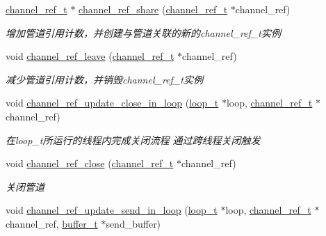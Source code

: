 \begin{DoxyCompactItemize}
\hyperlink{a00050_a151271c9d188ef28d4d24bb81dcc1263_a151271c9d188ef28d4d24bb81dcc1263}{channel\+\_\+ref\+\_\+t} $\ast$ \hyperlink{a00101_ga7b76c4078bbe8272206a5d7467ccd4ed_ga7b76c4078bbe8272206a5d7467ccd4ed}{channel\+\_\+ref\+\_\+share} (\hyperlink{a00050_a151271c9d188ef28d4d24bb81dcc1263_a151271c9d188ef28d4d24bb81dcc1263}{channel\+\_\+ref\+\_\+t} $\ast$channel\+\_\+ref)
\begin{DoxyCompactList}\small\item\em 增加管道引用计数，并创建与管道关联的新的channel\+\_\+ref\+\_\+t实例 \end{DoxyCompactList}\item 
void \hyperlink{a00101_gab4248c6e10ac538b5d37b927bbe39ef1_gab4248c6e10ac538b5d37b927bbe39ef1}{channel\+\_\+ref\+\_\+leave} (\hyperlink{a00050_a151271c9d188ef28d4d24bb81dcc1263_a151271c9d188ef28d4d24bb81dcc1263}{channel\+\_\+ref\+\_\+t} $\ast$channel\+\_\+ref)
\begin{DoxyCompactList}\small\item\em 减少管道引用计数，并销毁channel\+\_\+ref\+\_\+t实例 \end{DoxyCompactList}\item 
void \hyperlink{a00047_acd7537431cf488ed39e782e63f79d997_acd7537431cf488ed39e782e63f79d997}{channel\+\_\+ref\+\_\+update\+\_\+close\+\_\+in\+\_\+loop} (\hyperlink{a00050_a9c3ad1cd2de83e09f3a7b59fa82c94ee_a9c3ad1cd2de83e09f3a7b59fa82c94ee}{loop\+\_\+t} $\ast$loop, \hyperlink{a00050_a151271c9d188ef28d4d24bb81dcc1263_a151271c9d188ef28d4d24bb81dcc1263}{channel\+\_\+ref\+\_\+t} $\ast$channel\+\_\+ref)
\begin{DoxyCompactList}\small\item\em 在loop\+\_\+t所运行的线程内完成关闭流程 通过跨线程关闭触发 \end{DoxyCompactList}\item 
void \hyperlink{a00101_ga49d6ba5f0b9aad95ae5c5710dca392a1_ga49d6ba5f0b9aad95ae5c5710dca392a1}{channel\+\_\+ref\+\_\+close} (\hyperlink{a00050_a151271c9d188ef28d4d24bb81dcc1263_a151271c9d188ef28d4d24bb81dcc1263}{channel\+\_\+ref\+\_\+t} $\ast$channel\+\_\+ref)
\begin{DoxyCompactList}\small\item\em 关闭管道 \end{DoxyCompactList}\item 
void \hyperlink{a00047_ab2afcbb2288d9654f7eb656a8c242167_ab2afcbb2288d9654f7eb656a8c242167}{channel\+\_\+ref\+\_\+update\+\_\+send\+\_\+in\+\_\+loop} (\hyperlink{a00050_a9c3ad1cd2de83e09f3a7b59fa82c94ee_a9c3ad1cd2de83e09f3a7b59fa82c94ee}{loop\+\_\+t} $\ast$loop, \hyperlink{a00050_a151271c9d188ef28d4d24bb81dcc1263_a151271c9d188ef28d4d24bb81dcc1263}{channel\+\_\+ref\+\_\+t} $\ast$channel\+\_\+ref, \hyperlink{a00050_aad99a77d28bd81d3d36d0ea569c9482d_aad99a77d28bd81d3d36d0ea569c9482d}{buffer\+\_\+t} $\ast$send\+\_\+buffer)

\end{DoxyCompactItemize}
